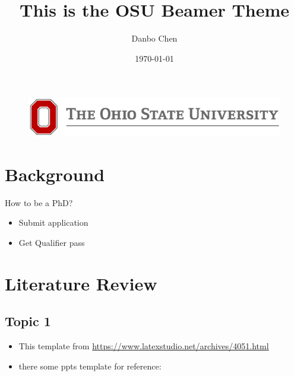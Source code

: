 \documentclass{beamer}
\author{Danbo Chen}
\title{This is the OSU Beamer Theme}
\institute{AEDE}
\date{\today}
\begin{document}
\begin{frame}
    \titlepage
    \begin{figure}[htbp]
       \raggedleft %
        \vspace{1.5cm} %
        \includegraphics[scale=0.2]{pic/LOGO.png}
    \end{figure}
\end{frame}

\begin{frame}
    \tableofcontents[sectionstyle=show,subsectionstyle=show/shaded/hide,subsubsectionstyle=show/shaded/hide]
\end{frame}


\section{Background}

\begin{frame}{How to be a PhD?}
    \begin{itemize}[<+-| alert@+>] %
        \item Submit application
        \item Get Qualifier pass
    \end{itemize}
\end{frame}


\section{Literature Review}

\subsection{Topic 1}

\begin{frame}
    \begin{itemize}
        \item This template from \newline \url{https://www.latexstudio.net/archives/4051.html}
        \item there some ppts template for reference: \href{https://github.com/Trinkle23897/oi_slides}{\color{purple}{click me}}
    \end{itemize}
\end{frame}
\end{document}
